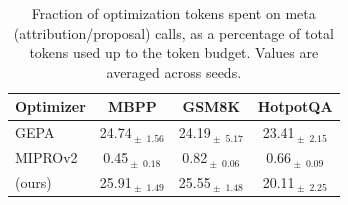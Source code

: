 \begin{table}[h]
  \centering
  \caption{Fraction of optimization tokens spent on meta (attribution/proposal) calls, as a percentage of total tokens used up to the token budget. Values are averaged across seeds.}
  \label{tab:frac-meta-tokens}
  \renewcommand{\arraystretch}{1}
  \begin{tabular}{lccc}
    \toprule
    \textbf{Optimizer} & \textbf{MBPP} & \textbf{GSM8K} & \textbf{HotpotQA} \\
    \midrule
    GEPA & 24.74\,$_{\pm\phantom{0}1.56}$ & 24.19\,$_{\pm\phantom{0}5.17}$ & 23.41\,$_{\pm\phantom{0}2.15}$ \\
    MIPROv2 & \phantom{0}0.45\,$_{\pm\phantom{0}0.18}$ & \phantom{0}0.82\,$_{\pm\phantom{0}0.06}$ & \phantom{0}0.66\,$_{\pm\phantom{0}0.09}$ \\
    \alg{} (ours) & 25.91\,$_{\pm\phantom{0}1.49}$ & 25.55\,$_{\pm\phantom{0}1.48}$ & 20.11\,$_{\pm\phantom{0}2.25}$ \\
    \bottomrule
  \end{tabular}
\end{table}
